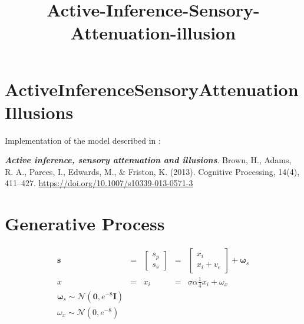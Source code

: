 \documentclass[11pt]{article}
\title{Active-Inference-Sensory-Attenuation-illusion}
\begin{document}
\maketitle

\section{ActiveInferenceSensoryAttenuationIllusions}
\label{activeinferencesensoryattenuationillusions}

Implementation of the model described in :

\textbf{\emph{Active inference, sensory attenuation and
illusions}}.  Brown, H., Adams, R. A., Parees, I., Edwards,
M., \& Friston, K. (2013).  Cognitive Processing, 14(4),
411--427.  \url{https://doi.org/10.1007/s10339-013-0571-3}

\section*{Generative Process}

$$
\begin{array}{lllll}
    \mathbf{s} &=& \left[ \begin{array}{c} s_p \\ s_s \end{array} \right] &=&
    \left[ \begin{array}{c} x_i \\ 
    x_i + v_e \end{array} \right] + \boldsymbol{\omega}_s \\ 
    \dot{x} &=& \dot{x}_i &=& \sigma{\alpha} \frac{1}{4} x_i + \omega_x\\ 
    \boldsymbol{\omega}_s \sim \mathcal{N}(\mathbf{0}, e ^ {-8} \mathbf{I})\\ 
    \omega_x \sim \mathcal{N}(0, e ^ {-8})
\end{array}
$$
\end{document}
